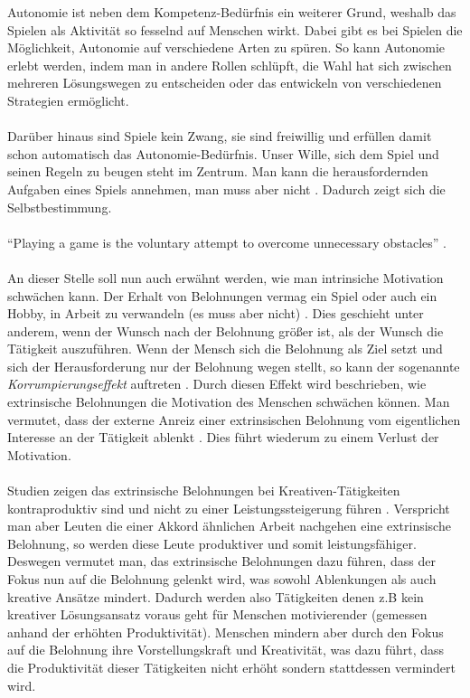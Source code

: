 \documentclass[a4paper,12pt]{scrartcl}
\begin{document}
Autonomie ist neben dem Kompetenz-Bedürfnis ein weiterer Grund, weshalb das Spielen als Aktivität so fesselnd auf Menschen wirkt. Dabei gibt es bei Spielen die Möglichkeit, Autonomie auf verschiedene Arten zu spüren. So kann Autonomie erlebt werden, indem man in andere Rollen schlüpft, die Wahl hat sich zwischen mehreren Lösungswegen zu entscheiden oder das entwickeln von verschiedenen Strategien ermöglicht.
\\\\
Darüber hinaus sind Spiele kein Zwang, sie sind freiwillig und erfüllen damit schon automatisch das Autonomie-Bedürfnis. Unser Wille, sich dem Spiel und seinen Regeln zu beugen steht im Zentrum. Man kann die herausfordernden Aufgaben eines Spiels annehmen, man muss aber nicht \cite{Rigby2011}. Dadurch zeigt sich die Selbstbestimmung. 
\\\\
\enquote{Playing a game is the voluntary attempt to overcome unnecessary obstacles} \cite{Mcgonigal2011}.
\\\\
An dieser Stelle soll nun auch erwähnt werden, wie man intrinsiche Motivation schwächen kann. Der Erhalt von Belohnungen vermag ein Spiel oder auch ein Hobby, in Arbeit zu verwandeln (es muss aber nicht) \cite{Pink2010}. Dies geschieht unter anderem, wenn der Wunsch nach der Belohnung größer ist, als der Wunsch die Tätigkeit auszuführen. Wenn der Mensch sich die Belohnung als Ziel setzt und sich der Herausforderung nur der Belohnung wegen stellt, so kann der sogenannte \textit{Korrumpierungseffekt} auftreten \cite{Rheinberg2006}. Durch diesen Effekt wird beschrieben, wie extrinsische Belohnungen die Motivation des Menschen schwächen können. Man vermutet, dass der externe Anreiz einer extrinsischen Belohnung vom eigentlichen Interesse an der Tätigkeit ablenkt \cite{Rheinberg2006}. Dies führt wiederum zu einem Verlust der Motivation.   
\\\\
Studien zeigen das extrinsische Belohnungen bei Kreativen-Tätigkeiten kontraproduktiv sind und nicht zu einer Leistungssteigerung führen \cite{Pink2010}. Verspricht man aber Leuten die einer Akkord ähnlichen Arbeit nachgehen eine extrinsische Belohnung, so werden diese Leute produktiver und somit leistungsfähiger. Deswegen vermutet man, das extrinsische Belohnungen dazu führen, dass der Fokus nun auf die Belohnung gelenkt wird, was sowohl Ablenkungen als auch kreative Ansätze mindert. Dadurch werden also Tätigkeiten denen z.B kein kreativer Lösungsansatz voraus geht für Menschen motivierender (gemessen anhand der erhöhten Produktivität). Menschen mindern aber durch den Fokus auf die Belohnung ihre Vorstellungskraft und Kreativität, was dazu führt, dass die Produktivität dieser Tätigkeiten nicht erhöht sondern stattdessen vermindert wird.
\end{document}
